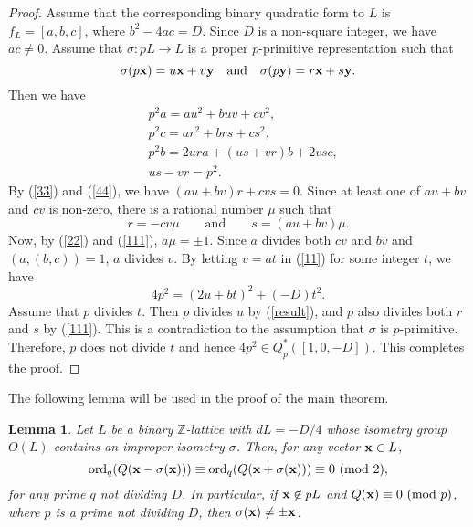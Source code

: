 \documentclass{amsart}
\newtheorem{lem}[thm]{Lemma}
\theoremstyle{definition}
\theoremstyle{remark}
\numberwithin{equation}{section}
\begin{document}
\begin{proof}
 \vskip 0.2cm 
 Assume that the corresponding binary quadratic form to $L$ is $f_L=[a,b,c]$, where $b^2-4ac=D$. Since $D$ is a non-square integer, we have $ac \ne 0$.  Assume that $\sigma  : pL \to L$ is a proper $p$-primitive representation  such that 
$$
\sigma(p\bold x)=u\bold x+v\bold y \quad \text{and} \quad \sigma(p\bold y)=r\bold x+s\bold y.
$$
Then we have
\begin{align} 
\label{11} &p^2a=au^2+buv+cv^2\!,\\
\label{22}&p^2c=ar^2+brs+cs^2\!,\\
\label{33}&p^2b=2ura+(us+vr)b+2vsc,\\
\label{44}&us-vr= p^2.
\end{align}
By (\ref{33}) and (\ref{44}), we have $(au+bv)r+cvs=0$. Since at least one of $au+bv$ and $cv$ is non-zero, 
 there is a rational number $\mu$ such that
\begin{equation} \label{111}
r=-cv\mu \qquad \text{and}  \qquad s=(au+bv)\mu. 
\end{equation}
 Now, by (\ref{22}) and (\ref{111}),  $a \mu=\pm 1$.   Since $a$ divides both $cv$ and $bv$ and $(a,(b,c))=1$, $a$ divides $v$.  By letting $v=at$ in  (\ref{11}) for some integer $t$, we have 
 \begin{equation} \label{result}
4p^2=(2u+bt)^2+(-D)t^2.
\end{equation}
 Assume that $p$ divides $t$. Then $p$ divides $u$ by (\ref{result}), and  $p$ also divides both $r$ and $s$ by (\ref{111}). This is a contradiction to the assumption that $\sigma$ is $p$-primitive. Therefore, $p$ does not divide $t$ and hence $4p^2 \in Q_p^*([1,0,-D])$.   This completes the proof. 
 \end{proof}
 
 The following lemma will be used in the proof of the main theorem. 
 
 \begin{lem}  \label{count}  Let $L$ be a binary ${{\mathbb Z}}$-lattice with $dL=-D/4$ whose isometry group $O(L)$ contains an improper isometry $\sigma$.  Then, for any vector $\bold x \in L$,  
 $$
 {\text{ord}}_q(Q(\bold x-\sigma(\bold x)))\equiv {\text{ord}}_q(Q(\bold x+\sigma(\bold x))) \equiv 0 \ (\text{mod $2$}), 
 $$ 
 for any prime $q$ not dividing $D$.  In particular,  if $\bold x \not \in pL$ and $Q(\bold x) \equiv 0 \ (\text{mod } p)$, where $p$ is a prime not dividing $D$, then $\sigma(\bold x) \ne \pm \bold x$.  
\end{lem}
\end{document}
